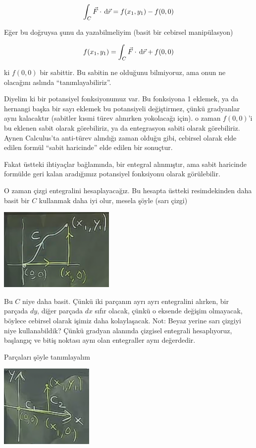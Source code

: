 \documentclass[12pt,fleqn]{article}\usepackage{../../common}
\begin{document}
$$ \int_C \vec{F} \cdot \,\mathrm{d}\vec{r} = 
f(x_1,y_1) - f(0,0)
$$

Eğer bu doğruysa şunu da yazabilmeliyim (basit bir cebirsel manipülasyon)

$$ f(x_1,y_1) = \int_C \vec{F} \cdot \,\mathrm{d}\vec{r} + f(0,0) $$

ki $f(0,0)$ bir sabittir. Bu sabitin ne olduğunu bilmiyoruz, ama onun ne
olacağını aslında ``tanımlayabiliriz''. 

Diyelim ki bir potansiyel fonksiyonumuz var. Bu fonksiyona 1 eklemek, ya da
hernangi başka bir sayı eklemek bu potansiyeli değiştirmez, çünkü gradyanlar
aynı kalacaktır (sabitler kısmi türev alınırken yokolacağı için). o zaman
$f(0,0)$'i bu eklenen sabit olarak görebiliriz, ya da entegrasyon sabiti olarak
görebiliriz. Aynen Calculus'ta anti-türev alındığı zaman olduğu gibi, cebirsel
olarak elde edilen formül ``sabit haricinde'' elde edilen bir sonuçtur.

Fakat üstteki ihtiyaçlar bağlamında, bir entegral alınmıştır, ama sabit
haricinde formülde geri kalan aradığımız potansiyel fonksiyonu olarak
görülebilir.

O zaman çizgi entegralini hesaplayacağız. Bu hesapta üstteki resimdekinden daha
basit bir $C$ kullanmak daha iyi olur, mesela şöyle (sarı çizgi)

\begin{center}

\includegraphics[height=4cm]{21_3.png}


\end{center}

Bu $C$ niye daha basit. Çünkü iki parçanın ayrı ayrı entegralini alırken, bir
parçada $dy$, diğer parçada $dx$ sıfır olacak, çünkü o eksende değişim
olmayacak, böylece cebirsel olarak işimiz daha kolaylaşacak. Not: Beyaz yerine
sarı çizgiyi niye kullanabildik? Çünkü gradyan alanında çizgisel entegrali
hesaplıyoruz, başlangıç ve bitiş noktası aynı olan entegraller aynı değerdedir.

Parçaları şöyle tanımlayalım

\begin{center}

\includegraphics[height=4cm]{21_4.png}

\end{center}
\end{document}
